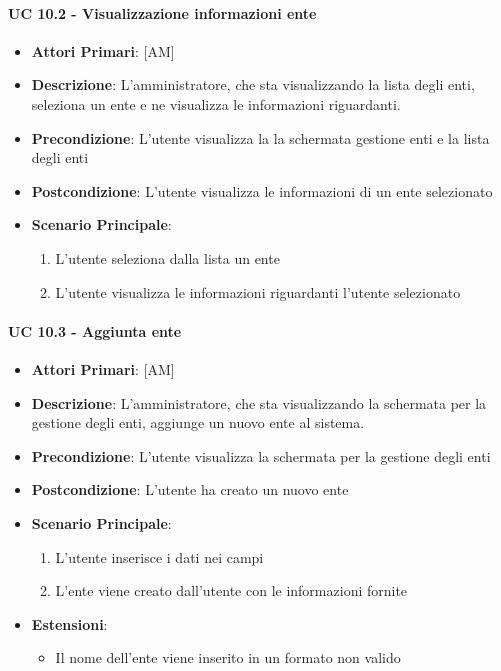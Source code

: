 			\paragraph{UC 10.2 - Visualizzazione informazioni ente}
			\begin{itemize}
				\item \textbf{Attori Primari}: [AM]
				\item \textbf{Descrizione}: L'amministratore, che sta visualizzando la lista degli enti, seleziona un ente e ne visualizza le informazioni riguardanti.
				\item \textbf{Precondizione}: L'utente visualizza la la schermata gestione enti e la lista degli enti
				\item \textbf{Postcondizione}: L'utente visualizza le informazioni di un ente selezionato
				\item \textbf{Scenario Principale}:
				\begin{enumerate}
					\item{L'utente seleziona dalla lista un ente}
					\item{L'utente visualizza le informazioni riguardanti l'utente selezionato}
				\end{enumerate}	
			\end{itemize}

			\paragraph{UC 10.3 - Aggiunta ente}
			\begin{itemize}
				\item \textbf{Attori Primari}: [AM]
				\item \textbf{Descrizione}: L'amministratore, che sta visualizzando la schermata per la gestione degli enti, aggiunge un nuovo ente al sistema.
				\item \textbf{Precondizione}: L'utente visualizza la schermata per la gestione degli enti
				\item \textbf{Postcondizione}: L'utente ha creato un nuovo ente
				\item \textbf{Scenario Principale}:
				\begin{enumerate}
					\item{L'utente inserisce i dati nei campi}
					\item{L'ente viene creato dall'utente con le informazioni fornite}
				\end{enumerate}	
				\item \textbf{Estensioni}:
					\begin{itemize}
						\item Il nome dell'ente viene inserito in un formato non valido
					\end{itemize}
			\end{itemize}		


